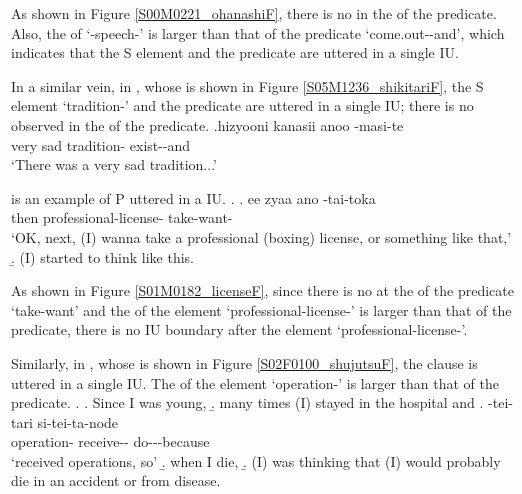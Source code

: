 As shown in Figure \ref{S00M0221_ohanashiF},
there is no  in the  of the predicate.
Also,
the  of  `-speech-' is larger
than that of the predicate  `come.out--and',
which indicates that the S element and the predicate are uttered in a single IU.

In a similar vein, in \Next,
whose  is shown in Figure \ref{S05M1236_shikitariF},
the S element  `tradition-' and the predicate
are uttered in a single IU;
there is no  observed in the  of the predicate.
%
\exg.\label{S05M1236_shikitari}hizyooni kanasii \tp{\dvline} anoo \tp{\dvline}  -masi-te \tp{\dvline} \\
	very sad {}  {} tradition- exist--and {} \\
	`There was a very sad tradition...'

\Next[a] is an example of P uttered in a  IU.
%
\ex.\label{S01M0182_license}
 \ag. ee zyaa \tp{\dvline} ano  -tai-toka \tp{\dvline} \\
 		 then {}  professional-license- take-want- {} \\
		`OK, next, (I) wanna take a professional (boxing) license, or something like that,'
 \b. (I) started to think like this.

As shown in Figure \ref{S01M0182_licenseF},
since there is no  at the  of the predicate  `take-want' and the  of the element  `professional-license-' is larger than that of the predicate,
there is no IU boundary after the element  `professional-license-'.

Similarly, in \Next[c],
whose  is shown in Figure \ref{S02F0100_shujutsuF},
the clause is uttered in a single IU.
The  of the element  `operation-'
is larger than that of the predicate.
%
\ex.\label{S02F0100_shujutsu}
 \a. Since I was young,
 \b. many times (I) stayed in the hospital and
 \bg.  -tei-tari \tp{\dvline} si-tei-ta-node \tp{\dvline} \\
 		operation- receive-- {} do---because {} \\
		`received operations, so'
 \b. when I die,
 \b. (I) was thinking that (I) would probably die in an accident or from disease.

